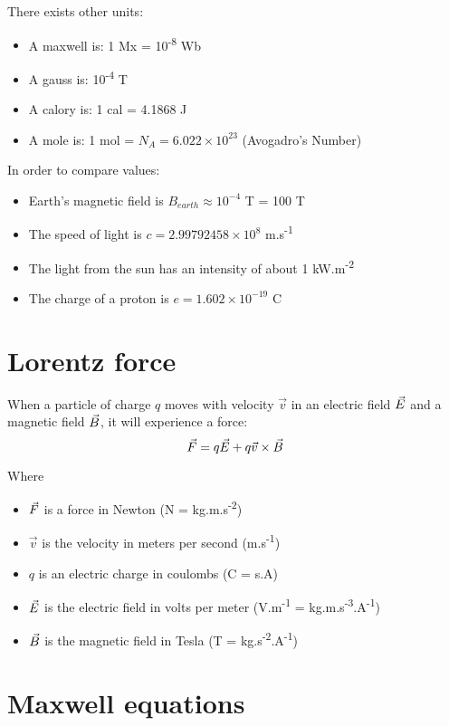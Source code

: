 \documentclass[a4paper,10pt]{article}
\newcommand{\vF}{\ensuremath\vec{F}} %
\newcommand{\vE}{\ensuremath\vec{E}} %
\newcommand{\vB}{\ensuremath\vec{B}} %
\begin{document}
There exists other units:

\begin{itemize}
  \item A maxwell is: 1 Mx = 10\textsuperscript{-8} Wb
  \item A gauss is: 10\textsuperscript{-4} T
  \item A calory is: 1 cal = 4.1868 J
  \item A mole is: 1 mol = $N_A = 6.022 \times 10^{23}$ (Avogadro's Number)
\end{itemize}

In order to compare values:
\begin{itemize}
  \item Earth's magnetic field is $B_{earth} \approx 10^{-4}$ T = 100 \textmu T
  \item The speed of light is $c = 2.99792458 \times 10^8$ m.s\textsuperscript{-1}
  \item The light from the sun has an intensity of about 1 kW.m\textsuperscript{-2}
  \item The charge of a proton is $e = 1.602 \times 10^{-19}$ C
\end{itemize}

\section{Lorentz force}

When a particle of charge $q$ moves with velocity $\vec{v}$ in an electric field $\vE$ and a magnetic field $\vB$, it will experience a force:
\begin{equation}
  \vF = q \vE + q\vec{v} \times \vB
\end{equation}

Where
\begin{itemize}
  \item $\vF$ is a force in Newton (N = kg.m.s\textsuperscript{-2})
  \item $\vec{v}$ is the velocity in meters per second (m.s\textsuperscript{-1})
  \item $q$ is an electric charge in coulombs (C = s.A)
  \item $\vE$ is the electric field in volts per meter (V.m\textsuperscript{-1} = kg.m.s\textsuperscript{-3}.A\textsuperscript{-1})
  \item $\vB$ is the magnetic field in Tesla (T = kg.s\textsuperscript{-2}.A\textsuperscript{-1})
\end{itemize}

\section{Maxwell equations}
\end{document}
